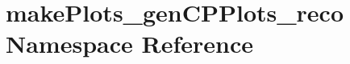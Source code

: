 \hypertarget{namespacemakePlots__genCPPlots__reco}{
\section{makePlots\_\-genCPPlots\_\-reco Namespace Reference}
\label{namespacemakePlots__genCPPlots__reco}
}

